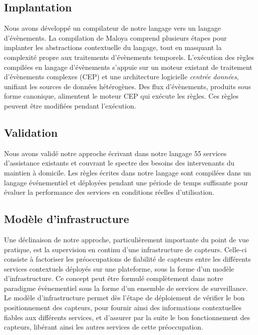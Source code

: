 \subsection{Implantation}
Nous avons développé un compilateur de notre langage vers un langage d'évènements. La compilation de Maloya comprend plusieurs étapes pour implanter les abstractions contextuelle du langage, tout en masquant la complexité propre aux traitements d'évènements temporels. L'exécution des règles compilées en langage d'évènements s’appuie sur un moteur existant de traitement d’évènements complexes (CEP) et une architecture logicielle {\em centrée données}, unifiant les sources de données hétérogènes. Des flux d'évènements, produits sous forme canonique, alimentent le moteur CEP qui exécute les règles. Ces règles peuvent être modifiées pendant l'exécution.


\subsection{Validation}
Nous avons validé notre approche écrivant dans notre langage 55 services d'assistance existants et couvrant le spectre des besoins des intervenants du maintien à domicile. Les règles écrites dans notre langage sont compilées dans un langage événementiel et déployées pendant une période de temps suffisante pour évaluer la performance des services en conditions réelles d'utilisation.

\subsection{Modèle d'infrastructure}
Une déclinaison de notre approche, particulièrement importante du point de vue pratique, est la supervision en continu d'une infrastructure de capteurs. Celle-ci consiste à factoriser les préoccupations de fiabilité de capteurs entre les différents services contextuels déployés sur une plateforme, sous la forme d'un modèle d'infrastructure. Ce concept peut être formulé complètement dans notre paradigme évènementiel sous la forme d'un ensemble de services de surveillance. Le modèle d'infrastructure permet dès l'étape de déploiement de vérifier le bon positionnement des capteurs, pour fournir ainsi des informations contextuelles fiables aux différents services, et d'assurer par la suite le bon fonctionnement des capteurs, libérant ainsi les autres services de cette préoccupation.

